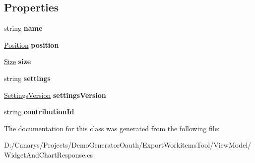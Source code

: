 \subsection*{Properties}
\begin{DoxyCompactItemize}
\item 
\mbox{\label{class_templates_generator_tool_1_1_view_model_1_1_widget_and_chart_response_1_1_value_a5275f16fcce463c10b9f717c3c51ca7a}} 
string {\bfseries name}
\item 
\mbox{\label{class_templates_generator_tool_1_1_view_model_1_1_widget_and_chart_response_1_1_value_aeddbeae9ff68e4625d91fc9c9aec7e90}} 
\mbox{\hyperlink{class_templates_generator_tool_1_1_view_model_1_1_widget_and_chart_response_1_1_position}{Position}} {\bfseries position}
\item 
\mbox{\label{class_templates_generator_tool_1_1_view_model_1_1_widget_and_chart_response_1_1_value_a7a2a9eb0c801762cae7710a82f537765}} 
\mbox{\hyperlink{class_templates_generator_tool_1_1_view_model_1_1_widget_and_chart_response_1_1_size}{Size}} {\bfseries size}
\item 
\mbox{\label{class_templates_generator_tool_1_1_view_model_1_1_widget_and_chart_response_1_1_value_a00078ef8995d038f610c2e95c4849424}} 
string {\bfseries settings}
\item 
\mbox{\label{class_templates_generator_tool_1_1_view_model_1_1_widget_and_chart_response_1_1_value_ac40970a04ee3de060d16f2d35a8d7f23}} 
\mbox{\hyperlink{class_templates_generator_tool_1_1_view_model_1_1_widget_and_chart_response_1_1_settings_version}{Settings\+Version}} {\bfseries settings\+Version}
\item 
\mbox{\label{class_templates_generator_tool_1_1_view_model_1_1_widget_and_chart_response_1_1_value_a1473a6b2f5dbb188fa4c7828855b3d37}} 
string {\bfseries contribution\+Id}
\end{DoxyCompactItemize}


The documentation for this class was generated from the following file\+:\begin{DoxyCompactItemize}
\item 
D\+:/\+Canarys/\+Projects/\+Demo\+Generator\+Oauth/\+Export\+Workitems\+Tool/\+View\+Model/Widget\+And\+Chart\+Response.\+cs\end{DoxyCompactItemize}
